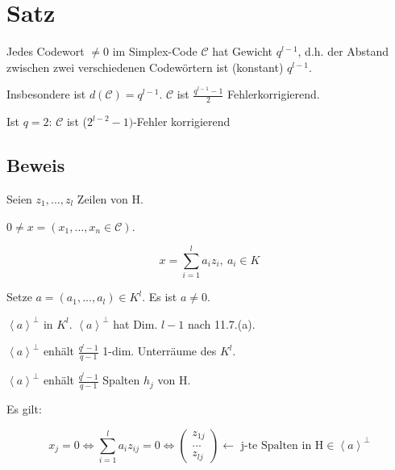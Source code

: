 \documentclass[a4paper, openany]{book}
\begin{document}
\section{Satz}

Jedes Codewort $\neq 0$ im Simplex-Code $\mathcal{C}$ hat Gewicht $q^{l-1}$, d.h. der Abstand zwischen zwei verschiedenen Codewörtern ist (konstant) $q^{l-1}$.

\par \medskip

Insbesondere ist $d(\mathcal{C}) = q^{l-1}$. $\mathcal{C}$ ist $\frac{q^{l-1}-1}{2}$ Fehlerkorrigierend.

\par \medskip

Ist $q=2$: $\mathcal{C}$ ist ($2^{l-2}-1)$-Fehler korrigierend


\subsection{Beweis}

Seien $z_1, ..., z_l$ Zeilen von H.

$0 \neq x = (x_1, ..., x_n \in \mathcal{C})$.

\[ x = \sum_{i=1}^l a_i z_i, \ a_i \in K \]

Setze $a = (a_1, ..., a_l) \in K^l$. Es ist $a \neq 0$.

\par \medskip

$\left \langle a \right \rangle^{\perp}$ in $K^l$. $\left \langle a \right \rangle^{\perp}$ hat Dim. $l-1$ nach 11.7.(a).

\par \medskip

$\left \langle a \right \rangle^{\perp}$ enhält $\frac{q^l -1}{q-1}$ 1-dim. Unterräume des $K^l$.

\par \medskip

$\left \langle a \right \rangle^{\perp}$ enhält $\frac{q^l -1 }{q-1}$ Spalten $h_j$ von H.

\par \medskip

Es gilt:

\[ x_j = 0 \Leftrightarrow \sum_{i=1}^l a_i z_{ij} = 0 \Leftrightarrow \begin{pmatrix}z_{1j} \\ ... \\ z_{lj} \end{pmatrix} \leftarrow \text{ j-te Spalten in H} \in \left \langle a \right \rangle^{\perp} \]
\end{document}
